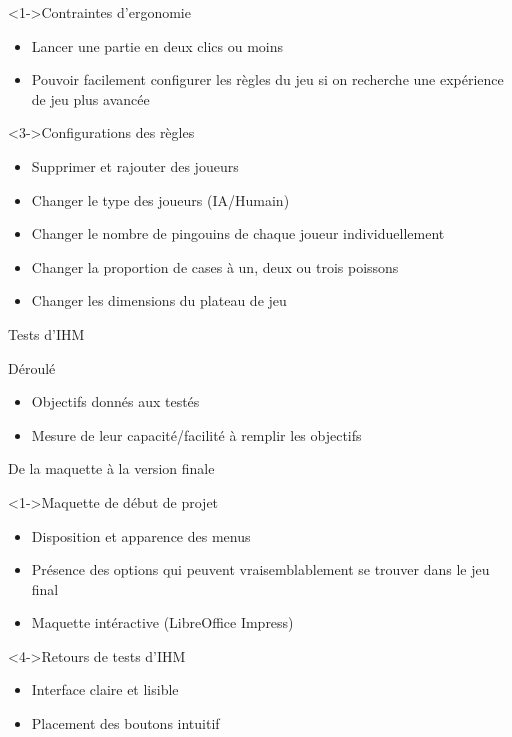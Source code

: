 \documentclass{beamer}
\begin{document}
\begin{frame}{}
  \begin{block}<1->{Contraintes d'ergonomie}
	\begin{itemize}
	\item <1-> Lancer une partie en deux clics ou moins
	\item <2-> Pouvoir facilement configurer les règles du jeu si on recherche une expérience de jeu plus avancée
  	\end{itemize}
  \end{block}
  \begin{block}<3->{Configurations des règles}
	\begin{itemize}
	\item <3-> Supprimer et rajouter des joueurs
	\item <4-> Changer le type des joueurs (IA/Humain)
	\item <5-> Changer le nombre de pingouins de chaque joueur individuellement
	\item <6-> Changer la proportion de cases à un, deux ou trois poissons
	\item <7-> Changer les dimensions du plateau de jeu
  	\end{itemize}
  \end{block}
\end{frame}

\begin{frame}{Tests d'IHM}
  \begin{block}{Déroulé}
	\begin{itemize}
	\item <1-> Objectifs donnés aux testés
	\item <2-> Mesure de leur capacité/facilité à remplir les objectifs
	\end{itemize}
  \end{block}
\end{frame}

\begin{frame}{De la maquette à la version finale}
  \begin{block}<1->{Maquette de début de projet}
	\begin{itemize}
	\item <1-> Disposition et apparence des menus
	\item <2-> Présence des options qui peuvent vraisemblablement se trouver dans le jeu final
	\item <3-> Maquette intéractive (LibreOffice Impress)
  	\end{itemize}
  \end{block}
  \begin{block}<4->{Retours de tests d'IHM}
    \begin{itemize}
	\item <4-> Interface claire et lisible
	\item <5-> Placement des boutons intuitif
	\end{itemize}
  \end{block}
\end{frame}
\end{document}
